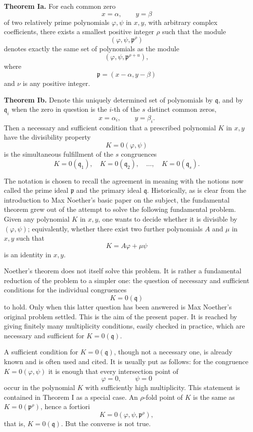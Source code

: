 \documentclass[11pt]{article}
\begin{document}
\textbf{Theorem Ia.} For each common zero
\[
  x=\alpha,
  \qquad
  y=\beta
\]
of two relatively prime polynomials \(\varphi,\psi\) in \(x,y\), with arbitrary complex coefficients, there exists a smallest positive integer \(\rho\) such that the module
\[
  (\varphi,\psi,\mathfrak p^{\rho})
\]
denotes exactly the same set of polynomials as the module
\[
  (\varphi,\psi,\mathfrak p^{\rho+
u}),
\]
where
\[
  \mathfrak p=(x-\alpha,y-\beta)
\]
and \(\nu\) is any positive integer.

\textbf{Theorem Ib.} Denote this uniquely determined set of polynomials by \(\mathfrak q\), and by \(\mathfrak q_i\) when the zero in question is the \(i\)-th of the \(s\) distinct common zeros,
\[
  x=\alpha_i,
  \qquad
  y=\beta_i.
\]
Then a necessary and sufficient condition that a prescribed polynomial \(K\) in \(x,y\) have the divisibility property
\[
  K=0(\varphi,\psi)
\]
is the simultaneous fulfillment of the \(s\) congruences
\[
  K=0(\mathfrak q_1),\quad
  K=0(\mathfrak q_2),\quad \ldots,\quad
  K=0(\mathfrak q_s).
\]

The notation is chosen to recall the agreement in meaning with the notions now called the prime ideal \(\mathfrak p\) and the primary ideal \(\mathfrak q\). Historically, as is clear from the introduction to Max Noether's basic paper on the subject, the fundamental theorem grew out of the attempt to solve the following fundamental problem. Given any polynomial \(K\) in \(x,y\), one wants to decide whether it is divisible by \((\varphi,\psi)\); equivalently, whether there exist two further polynomials \(A\) and \(\mu\) in \(x,y\) such that
\[
  K=A\varphi+\mu\psi
\]
is an identity in \(x,y\).

Noether's theorem does not itself solve this problem. It is rather a fundamental reduction of the problem to a simpler one: the question of necessary and sufficient conditions for the individual congruences
\[
  K=0(\mathfrak q)
\]
to hold. Only when this latter question has been answered is Max Noether's original problem settled. This is the aim of the present paper. It is reached by giving finitely many multiplicity conditions, easily checked in practice, which are necessary and sufficient for \(K=0(\mathfrak q)\).

A sufficient condition for \(K=0(\mathfrak q)\), though not a necessary one, is already known and is often used and cited. It is usually put as follows: for the congruence \(K=0(\varphi,\psi)\) it is enough that every intersection point of
\[
  \varphi=0,\qquad \psi=0
\]
occur in the polynomial \(K\) with sufficiently high multiplicity. This statement is contained in Theorem I as a special case. An \(\rho\)-fold point of \(K\) is the same as \(K=0(\mathfrak p^\rho)\), hence a fortiori
\[
  K=0(\varphi,\psi,\mathfrak p^{\rho}),
\]
that is, \(K=0(\mathfrak q)\). But the converse is not true.
\end{document}
